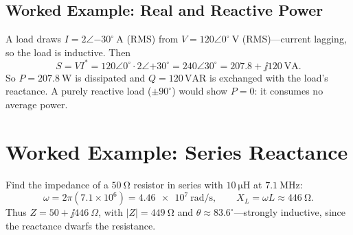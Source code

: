 \subsection{Worked Example: Real and Reactive Power}
A load draws \(I=2\angle{-30^\circ}\ \si{\ampere}\) (RMS) from
\(V=120\angle0^\circ\ \si{\volt}\) (RMS)---current lagging, so the load is
inductive. Then
\[
S=VI^{*}=120\angle0^\circ\cdot 2\angle{+30^\circ}=240\angle30^\circ
=207.8+\jj120\ \mathrm{VA}.
\]
So \(P=\SI{207.8}{\watt}\) is dissipated and \(Q=120\,\mathrm{VAR}\) is exchanged with
the load's reactance. A purely reactive load (\(\pm90^\circ\)) would show
\(P=0\): it consumes no average power.

\section{Worked Example: Series Reactance}
Find the impedance of a \(\SI{50}{\ohm}\) resistor in series with
\(\SI{10}{\micro\henry}\) at \(\SI{7.1}{\mega\hertz}\):
\[
\omega=2\pi(7.1\times10^6)=\SI{4.46e7}{\radian\per\second},
\qquad
X_L=\omega L\approx\SI{446}{\ohm}.
\]
Thus \(Z=50+\jj446\ \Omega\), with \(|Z|=\SI{449}{\ohm}\) and
\(\theta\approx83.6^\circ\)---strongly inductive, since the reactance dwarfs the
resistance.
